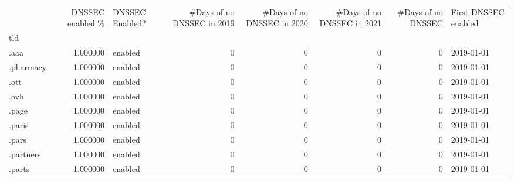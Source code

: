 \begin{tabular}{lrlrrrrl}
\toprule
{} &  DNSSEC enabled \% & DNSSEC Enabled? &  \#Days of no DNSSEC in 2019 &  \#Days of no DNSSEC in 2020 &  \#Days of no DNSSEC in 2021 &  \#Days of no DNSSEC & First DNSSEC enabled \\
tld                       &                   &                 &                             &                             &                             &                     &                      \\
\midrule
.aaa                      &          1.000000 &         enabled &                           0 &                           0 &                           0 &                   0 &           2019-01-01 \\
.pharmacy                 &          1.000000 &         enabled &                           0 &                           0 &                           0 &                   0 &           2019-01-01 \\
.ott                      &          1.000000 &         enabled &                           0 &                           0 &                           0 &                   0 &           2019-01-01 \\
.ovh                      &          1.000000 &         enabled &                           0 &                           0 &                           0 &                   0 &           2019-01-01 \\
.page                     &          1.000000 &         enabled &                           0 &                           0 &                           0 &                   0 &           2019-01-01 \\
.paris                    &          1.000000 &         enabled &                           0 &                           0 &                           0 &                   0 &           2019-01-01 \\
.pars                     &          1.000000 &         enabled &                           0 &                           0 &                           0 &                   0 &           2019-01-01 \\
.partners                 &          1.000000 &         enabled &                           0 &                           0 &                           0 &                   0 &           2019-01-01 \\
.parts                    &          1.000000 &         enabled &                           0 &                           0 &                           0 &                   0 &           2019-01-01 \\

\end{tabular}
